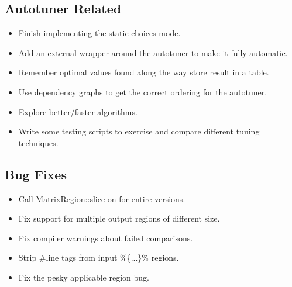 \documentclass[11pt]{article}
\begin{document}
\subsection{Autotuner Related}
\begin{itemize}

\item Finish implementing the static choices mode.

\item Add an external wrapper around the autotuner to make it fully automatic.

\item Remember optimal values found along the way store result in a table.

\item Use dependency graphs to get the correct ordering for the autotuner.

\item Explore better/faster algorithms.

\item Write some testing scripts to exercise and compare different tuning techniques.

\end{itemize}

\subsection{Bug Fixes}
\begin{itemize}

\item Call MatrixRegion::slice on for entire versions.

\item Fix support for multiple output regions of different size.

\item Fix compiler warnings about failed comparisons.

\item Strip \#line tags from input \%\{...\}\% regions.

\item Fix the pesky applicable region bug.

\end{itemize}
\end{document}

